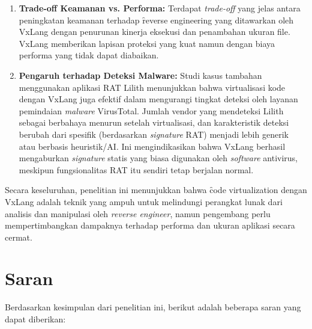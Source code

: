 \begin{enumerate}
    \item \textbf{Trade-off Keamanan vs. Performa:} Terdapat \textit{trade-off} yang jelas antara peningkatan keamanan terhadap \f{reverse engineering} yang ditawarkan oleh VxLang dengan penurunan kinerja eksekusi dan penambahan ukuran file. VxLang memberikan lapisan proteksi yang kuat namun dengan biaya performa yang tidak dapat diabaikan.

    \item \textbf{Pengaruh terhadap Deteksi Malware:} Studi kasus tambahan menggunakan aplikasi RAT Lilith menunjukkan bahwa virtualisasi kode dengan VxLang juga efektif dalam mengurangi tingkat deteksi oleh layanan pemindaian \textit{malware} VirusTotal. Jumlah vendor yang mendeteksi Lilith sebagai berbahaya menurun setelah virtualisasi, dan karakteristik deteksi berubah dari spesifik (berdasarkan \textit{signature} RAT) menjadi lebih generik atau berbasis heuristik/AI. Ini mengindikasikan bahwa VxLang berhasil mengaburkan \textit{signature} statis yang biasa digunakan oleh \textit{software} antivirus, meskipun fungsionalitas RAT itu sendiri tetap berjalan normal.
\end{enumerate}

Secara keseluruhan, penelitian ini menunjukkan bahwa \f{code virtualization} dengan VxLang adalah teknik yang ampuh untuk melindungi perangkat lunak dari analisis dan manipulasi oleh \textit{reverse engineer}, namun pengembang perlu mempertimbangkan dampaknya terhadap performa dan ukuran aplikasi secara cermat.

\section{Saran}
Berdasarkan kesimpulan dari penelitian ini, berikut adalah beberapa saran yang dapat diberikan:

